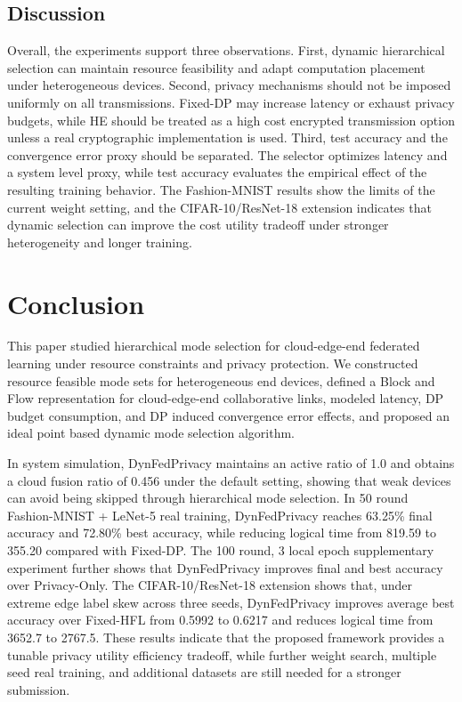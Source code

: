 ﻿\documentclass[preprint,12pt]{elsarticle}
\theoremstyle{plain}
\theoremstyle{definition}
\theoremstyle{remark}
\newcommand{\method}{DynFedPrivacy}
\begin{document}
\subsection{Discussion}
\label{sec:discussion}
Overall, the experiments support three observations.
First, dynamic hierarchical selection can maintain resource feasibility and adapt computation placement under heterogeneous devices.
Second, privacy mechanisms should not be imposed uniformly on all transmissions.
Fixed-DP may increase latency or exhaust privacy budgets, while HE should be treated as a high cost encrypted transmission option unless a real cryptographic implementation is used.
Third, test accuracy and the convergence error proxy should be separated.
The selector optimizes latency and a system level proxy, while test accuracy evaluates the empirical effect of the resulting training behavior.
The Fashion-MNIST results show the limits of the current weight setting, and the CIFAR-10/ResNet-18 extension indicates that dynamic selection can improve the cost utility tradeoff under stronger heterogeneity and longer training.

\section{Conclusion}
\label{sec:conclusion}
This paper studied hierarchical mode selection for cloud-edge-end federated learning under resource constraints and privacy protection.
We constructed resource feasible mode sets for heterogeneous end devices, defined a Block and Flow representation for cloud-edge-end collaborative links, modeled latency, DP budget consumption, and DP induced convergence error effects, and proposed an ideal point based dynamic mode selection algorithm.

In system simulation, \method{} maintains an active ratio of 1.0 and obtains a cloud fusion ratio of 0.456 under the default setting, showing that weak devices can avoid being skipped through hierarchical mode selection.
In 50 round Fashion-MNIST + LeNet-5 real training, \method{} reaches 63.25\% final accuracy and 72.80\% best accuracy, while reducing logical time from 819.59 to 355.20 compared with Fixed-DP.
The 100 round, 3 local epoch supplementary experiment further shows that \method{} improves final and best accuracy over Privacy-Only.
The CIFAR-10/ResNet-18 extension shows that, under extreme edge label skew across three seeds, \method{} improves average best accuracy over Fixed-HFL from 0.5992 to 0.6217 and reduces logical time from 3652.7 to 2767.5.
These results indicate that the proposed framework provides a tunable privacy utility efficiency tradeoff, while further weight search, multiple seed real training, and additional datasets are still needed for a stronger submission.
\end{document}
